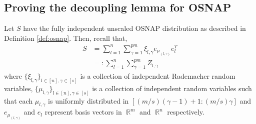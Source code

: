 \documentclass[11pt]{amsart}
\numberwithin{equation}{section}
\numberwithin{equation}{section}
\DeclareMathOperator{\R}{\mathbb{R}}
\theoremstyle{remark}
\theoremstyle{definition}
\begin{document}
\subsection{Proving the decoupling lemma for OSNAP} \label{subsec:decouposnap}
Let $S$ have the fully independent unscaled OSNAP distribution as described in Definition \ref{def:osnap}. Then, recall that,
\begin{align*}
    S &= \sum_{l=1}^n \sum_{\gamma=1}^{pm} \xi_{l,\gamma} e_{\mu_{(l, \gamma)}} e_l ^T \\
    &=: \sum_{l=1}^n \sum_{\gamma=1}^{pm} Z_{l,\gamma} 
\end{align*}
where $\{ \xi_{l,\gamma} \}_{l \in [n], \gamma \in [s]}$ is a collection of  independent Rademacher random variables, $\{ \mu_{l,\gamma} \}_{l \in [n], \gamma \in [s]}$ is a collection of independent random variables such that each $\mu_{l,\gamma}$ is uniformly distributed in $[(m/s)(\gamma-1)+1:(m/s)\gamma]$ and $e_{\mu_{(l, \gamma)}}$ and $e_l$ represent basis vectors in $\R^m$ and $\R^n$ respectively. 
\end{document}
